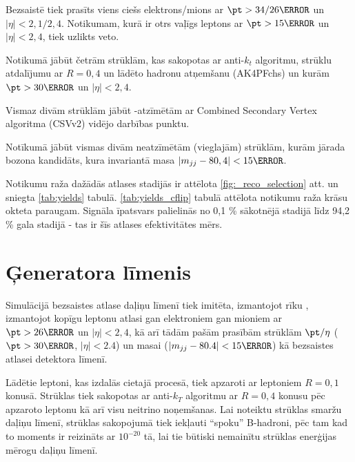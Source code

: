 Bezsaistē tiek prasīts viens ciešs elektrons/mions ar $\pt > 34/26\GeV$ un $|\eta|<2,1/2,4$. Notikumam, kurā ir otrs vaļīgs leptons ar $\pt > 15\GeV$ un $|\eta| < 2,4$, tiek uzlikts veto.

Notikumā jābūt četrām strūklām, kas sakopotas ar anti-$k_{t}$ algoritmu, strūklu atdalījumu ar $R=0,4$ un lādēto hadronu atņemšanu (AK4PFchs) un kurām $\pt>30\GeV$ un $|\eta|<2,4$. 

Vismaz divām strūklām jābūt \cPqb-atzīmētām ar Combined Secondary Vertex algoritma (CSVv2) vidējo darbības punktu. 

Notīkumā jābūt vismas divām neatzīmētām (vieglajām) strūklām, kurām jārada \PW bozona kandidāts, kura invariantā masa $\left|m_{jj}-80,4\right|<15\GeV$.

Notikumu raža dažādās atlases stadijās ir attēlota \ref{fig:_reco_selection} att. un sniegta \ref{tab:yields} tabulā. \ref{tab:yields_cflip} tabulā attēlota notikumu raža krāsu okteta \PW paraugam. Signāla īpatsvars palielinās no 0,1 \% sākotnējā stadijā līdz 94,2 \% gala stadijā - tas ir šīs atlases efektivitātes mērs.






\section{Ģeneratora līmenis}
\label{sec:generator_level}

Simulācijā bezsaistes atlase daļiņu līmenī tiek imitēta, izmantojot \PSEUDOTOPPRODUCER rīku \cite{code:pseudotop}, izmantojot kopīgu leptonu atlasi gan elektroniem gan mioniem ar $\pt>26\GeV$ un $|\eta| < 2,4$, kā arī tādām pašām prasībām strūklām $\pt/\eta$ ($\pt>30\GeV$, $|\eta| < 2.4$) un \PW masai ($\left|m_{jj}-80.4\right|<15\GeV$) kā bezsaistes atlasei detektora līmenī.

Lādētie leptoni, kas izdalās cietajā procesā, tiek apzaroti ar leptoniem $R=0,1$ konusā. Strūklas tiek sakopotas ar anti-$k_T$ algoritmu ar $R=0,4$ konusu pēc apzaroto leptonu kā arī visu neitrino noņemšanas. Lai noteiktu strūklas smaržu daļiņu līmenī, strūklas sakopojumā tiek iekļauti ``spoku'' B-hadroni, pēc tam kad to moments ir reizināts ar $10^{-20}$ tā, lai tie būtiski nemainītu strūklas enerģijas mērogu daļiņu līmenī.
